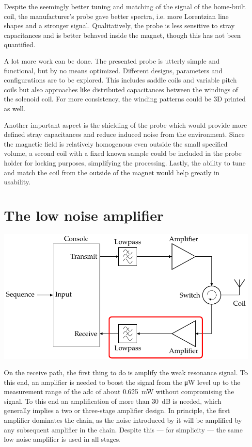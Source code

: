 Despite the seemingly better tuning and matching of the signal of the home-built coil, the manufacturer's probe gave better spectra, i.e. more Lorentzian line shapes and a stronger signal. Qualitatively, the probe is less sensitive to stray capacitances and is better behaved inside the magnet, though this has not been quantified.

A lot more work can be done. The presented probe is utterly simple and functional, but by no means optimized. Different designs, parameters and configurations are to be explored. This includes saddle coils and variable pitch coils but also approaches like distributed capacitances between the windings of the solenoid coil. For more consistency, the winding patterns could be 3D printed as well.

Another important aspect is the shielding of the probe which would provide more defined stray capacitances and reduce induced noise from the environment. Since the magnetic field is relatively homogenous even outside the small specified volume, a second coil with a fixed known sample could be included in the probe holder for locking purposes, simplifying the processing. Lastly, the ability to tune and match the coil from the outside of the magnet would help greatly in usability.

\section{The low noise amplifier}
\begin{marginfigure}
    \includegraphics{images/block_diagram_highlight_rx.pdf}
\end{marginfigure}

On the receive path, the first thing to do is amplify the weak resonance signal. To this end, an amplifier is needed to boost the signal from the \unit{\micro\watt} level up to the measurement range of the \acrshort{adc} of about \qty{0.625}{\milli\watt} without compromising the signal. To this end an amplification of more than \qty{30}{\deci\bel} is needed, which generally implies a two or three-stage amplifier design. In principle, the first amplifier dominates the chain, as the noise introduced by it will be amplified by any subsequent amplifier in the chain. Despite this --- for simplicity --- the same low noise amplifier is used in all stages.

